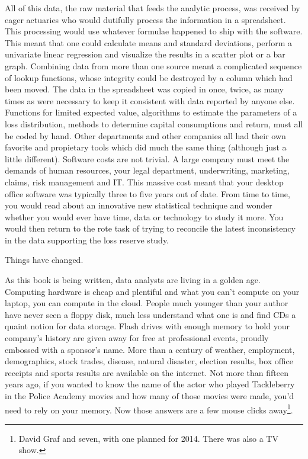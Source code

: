 All of this data, the raw material that feeds the analytic process, was received by eager actuaries who would dutifully process the information in a spreadsheet. This processing would use whatever formulae happened to ship with the software. This meant that one could calculate means and standard deviations, perform a univariate linear regression and visualize the results in a scatter plot or a bar graph. Combining data from more than one source meant a complicated sequence of lookup functions, whose integrity could be destroyed by a column which had been moved. The data in the spreadsheet was copied in once, twice, as many times as were necessary to keep it consistent with data reported by anyone else. Functions for limited expected value, algorithms to estimate the parameters of a loss distribution, methods to determine capital consumptions and return, must all be coded by hand. Other departments and other companies all had their own favorite and propietary tools which did much the same thing (although just a little different). Software costs are not trivial. A large company must meet the demands of human resources, your legal department, underwriting, marketing, claims, risk management and IT. This massive cost meant that your desktop office software was typically three to five years out of date. From time to time, you would read about an innovative new statistical technique and wonder whether you would ever have time, data or technology to study it more. You would then return to the rote task of trying to reconcile the latest inconsistency in the data supporting the loss reserve study.

Things have changed.

As this book is being written, data analysts are living in a golden age. Computing hardware is cheap and plentiful and what you can't compute on your laptop, you can compute in the cloud. People much younger than your author have never seen a floppy disk, much less understand what one is and find CDs a quaint notion for data storage. Flash drives with enough memory to hold your company's history are given away for free at professional events, proudly embossed with a sponsor's name. More than a century of weather, employment, demographics, stock trades, disease, natural disaster, election results, box office receipts and sports results are available on the internet. Not more than fifteen years ago, if you wanted to know the name of the actor who played Tackleberry in the Police Academy movies and how many of those movies were made, you'd need to rely on your memory. Now those answers are a few mouse clicks away\footnote{David Graf and seven, with one planned for 2014. There was also a TV show.}.

